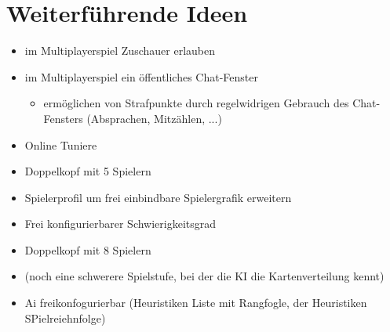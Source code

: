 \documentclass[12pt,a4paper]{article}
\begin{document}
\section{Weiterführende Ideen}
\begin{itemize}
\item im Multiplayerspiel Zuschauer erlauben
\item im Multiplayerspiel ein öffentliches Chat-Fenster
\begin{itemize}
\item ermöglichen von Strafpunkte durch regelwidrigen Gebrauch des Chat-Fensters (Absprachen, Mitzählen, ...)
\end{itemize}
\item Online Tuniere
\item Doppelkopf mit 5 Spielern
\item Spielerprofil um frei einbindbare Spielergrafik erweitern
\item Frei konfigurierbarer Schwierigkeitsgrad
\item Doppelkopf mit 8 Spielern
\item (noch eine schwerere Spielstufe, bei der die KI die Kartenverteilung kennt)
\item Ai freikonfogurierbar (Heuristiken Liste mit Rangfogle, der
Heuristiken SPielreiehnfolge)
\end{itemize}
\end{document}
